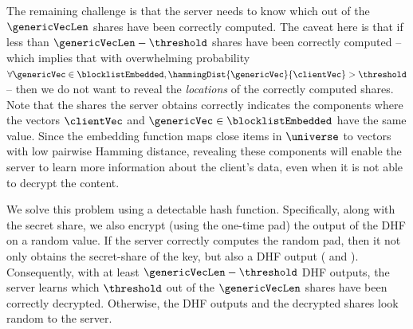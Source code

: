 The remaining challenge is that the server needs to know which out of the $\genericVecLen$ shares 
have been correctly computed. The caveat here is that if less than  $\genericVecLen - 
\threshold$ shares have been correctly computed -- which implies that with overwhelming 
probability $\forall \genericVec \in \blocklistEmbedded, \hammingDist{\genericVec}{\clientVec} > 
\threshold$ -- then we do not want to reveal the \textit{locations} of the correctly computed shares. 
Note that the shares the server obtains correctly indicates the components where the 
vectors $\clientVec$ and $\genericVec \in \blocklistEmbedded$ have the same value. 
Since the embedding function maps close items 
in $\universe$ to vectors with low pairwise Hamming distance, revealing these components will 
enable the server to learn more information about the client's data, even when it is not able to 
decrypt the content.  


We solve this problem using a detectable hash function. Specifically, along with the secret share, 
we also encrypt (using the one-time pad) the output of the DHF on a random value. If the server 
correctly computes the random pad, then it not only obtains the secret-share of the key, but also a 
DHF output ( and ). Consequently, with at 
least $\genericVecLen - \threshold$ DHF outputs, the 
server learns which $\threshold$ out of the $\genericVecLen$ shares have been correctly 
decrypted. Otherwise, the DHF 
outputs and the decrypted shares look random to the server. 



\setcounter{auditorLineNmbr}{0}
\setcounter{clientLineNmbr}{0}
\setcounter{serverLineNmbr}{0}


